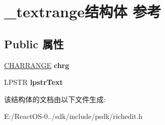 \hypertarget{struct__textrange}{}\section{\+\_\+textrange结构体 参考}
\label{struct__textrange}
\subsection*{Public 属性}
\begin{DoxyCompactItemize}
\item 
\mbox{\label{struct__textrange_a52d5f0c3fb39fcca50793bbfb067201d}} 
\hyperlink{struct__charrange}{C\+H\+A\+R\+R\+A\+N\+GE} {\bfseries chrg}
\item 
\mbox{\label{struct__textrange_acfa72c5d2cd83d6a1b3c620b0911c1eb}} 
L\+P\+S\+TR {\bfseries lpstr\+Text}
\end{DoxyCompactItemize}


该结构体的文档由以下文件生成\+:\begin{DoxyCompactItemize}
\item 
E\+:/\+React\+O\+S-\/0../sdk/include/psdk/richedit.\+h\end{DoxyCompactItemize}
